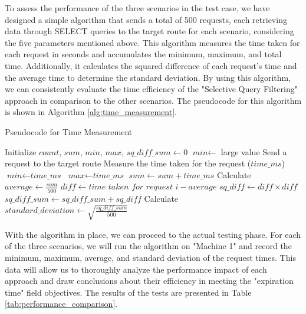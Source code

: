 \documentclass[a4paper,fleqn]{cas-dc}
\begin{document}
To assess the performance of the three scenarios in the test case, we have designed a simple algorithm that sends a total of 500 requests, each retrieving data through SELECT queries to the target route for each scenario, considering the five parameters mentioned above. This algorithm measures the time taken for each request in seconds and accumulates the minimum, maximum, and total time. Additionally, it calculates the squared difference of each request's time and the average time to determine the standard deviation. By using this algorithm, we can consistently evaluate the time efficiency of the "Selective Query Filtering" approach in comparison to the other scenarios. The pseudocode for this algorithm is shown in Algorithm \ref{alg:time_measurement}.

\begin{algorithm}
\caption{Pseudocode for Time Measurement}\label{alg:time_measurement}
\begin{algorithmic}[1]
\State Initialize $\textit{count}$, $\textit{sum}$, $\textit{min}$, $\textit{max}$, $\textit{sq\_diff\_sum} \gets 0$
\State $\textit{min} \gets$ large value
    \State Send a request to the target route
    \State Measure the time taken for the request ($\textit{time\_ms}$)
        \State $\textit{min} \gets \textit{time\_ms}$
    \EndIf
        \State $\textit{max} \gets \textit{time\_ms}$
    \EndIf
    \State $\textit{sum} \gets \textit{sum} + \textit{time\_ms}$
\EndFor
\State Calculate $\textit{average} \gets \frac{\textit{sum}}{500}$
    \State $\textit{diff} \gets \textit{time taken for request i} - \textit{average}$
    \State $\textit{sq\_diff} \gets \textit{diff} \times \textit{diff}$
    \State $\textit{sq\_diff\_sum} \gets \textit{sq\_diff\_sum} + \textit{sq\_diff}$
\EndFor
\State Calculate $\textit{standard\_deviation} \gets \sqrt{\frac{\textit{sq\_diff\_sum}}{500}}$
\end{algorithmic}
\end{algorithm}

With the algorithm in place, we can proceed to the actual testing phase. For each of the three scenarios, we will run the algorithm on "Machine 1" and record the minimum, maximum, average, and standard deviation of the request times. This data will allow us to thoroughly analyze the performance impact of each approach and draw conclusions about their efficiency in meeting the "expiration time" field objectives. The results of the tests are presented in Table \ref{tab:performance_comparison}.
\end{document}
